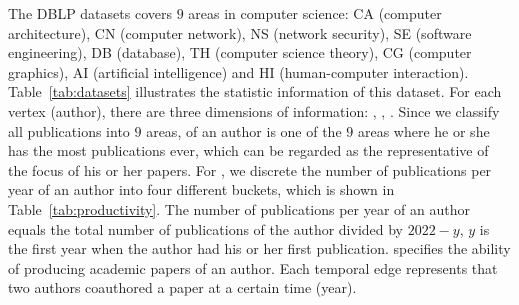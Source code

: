 \documentclass[10pt,journal,compsoc]{IEEEtran}
\begin{document}
 The DBLP datasets covers $ 9 $ areas in computer science: CA (computer architecture), CN (computer network), NS (network security), SE (software engineering), DB (database), TH (computer science theory), CG (computer graphics), AI (artificial intelligence) and HI (human-computer interaction). Table~\ref{tab:datasets} illustrates the statistic information of this dataset. For each vertex (author), there are three dimensions of information: , , . Since we classify all publications into $ 9 $ areas,  of an author is one of the $ 9 $ areas where he or she has the most publications ever, which can be regarded as the representative of the focus of his or her papers. For , we discrete the number of publications per year of an author into four different buckets, which is shown in Table~\ref{tab:productivity}. The number of publications per year of an author equals the total number of publications of the author divided by $ 2022-y $, $ y $ is the first year when the author had his or her first publication.  specifies the ability of producing academic papers of an author. Each temporal edge represents that two authors coauthored a paper at a certain time (year).
\end{document}
